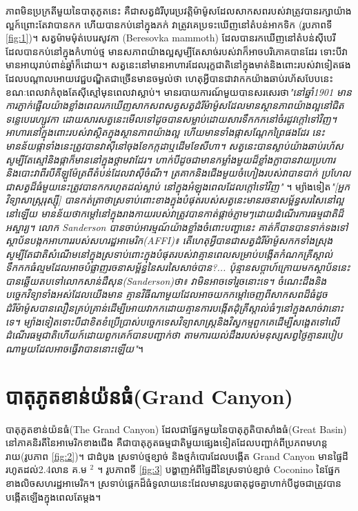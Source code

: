 \documentclass[10pt,twocolumn,letterpaper]{article}
\begin{document}
ភាពមិនប្រក្រតីមួយនៃបាតុភូតនេះ គឺជាសត្វដំរីបុរេប្រវត្តិម៉ាម៉ូសដែលសាកសពរបស់វាត្រូវបានរក្សាយ៉ាងល្អក៍ព្រោះតែវាបានកក ហើយបានកប់នៅក្នុងភក់ វាត្រូវគេប្រទះឃើញនៅតំបន់អាកទិក (រូបភាពទី \ref{fig:1})។ សត្វម៉ាមម៉ុត់បេរេសូវកា (Beresovka mammoth) ដែលបានរកឃើញនៅតំបន់ស៊ីបេរីដែលបានកប់នៅក្នុងកំហាប់ថ្ម មានសភាពយ៉ាងល្អសូម្បីតែសាច់របស់វាក៏អាចបរិភោគបានដែរ ទោះបីវាមានអាយុរាប់ពាន់ឆ្នាំក៏ដោយ។ សត្វនេះនៅមានអាហារដែលរុក្ខជាតិនៅក្នុងមាត់និងពោះរបស់វាទៀតផង ដែលបណ្ដាលអោយវេជ្ជបណ្ឌិតជាច្រើនមានចម្ងល់ថា ហេតុអ្វីបានជាវាកកយ៉ាងឆាប់រហ័សបែបនេះ ខណៈពេលវាកំពុងតែសុីស្មៅមុនពេលវាស្លាប់\cite{17}។ មានរបាយការណ៍មួយបានសរសេរថា\textit{"នៅឆ្នាំ1901 មានការភ្ញាក់ផ្អើលយ៉ាងខ្លាំងពេលរកឃើញសាកសពសត្វសត្វដំរីម៉ាម៉ូសដែលមានស្ថានភាពយ៉ាងល្អនៅជិតទន្លេបេរេហ្សូវកា ដោយសារសត្វនេះមើលទៅដូចបានសម្លាប់ដោយសារទឹកកកនៅចំរដូវក្តៅទៅវិញ។ អាហារនៅក្នុងពោះរបស់វាស្ថិតក្នុងស្ថានភាពយ៉ាងល្អ ហើយមានទាំងផ្កាសណ្តែកព្រៃផងដែរ នេះមានន័យផ្កាទាំងនេះត្រូវបានវាសុីនៅចុងខែកក្កដាឬដើមខែសីហា។ សត្វនេះបានស្លាប់យ៉ាងឆាប់រហ័សសូម្បីតែស្មៅនិងផ្កាក៏មាននៅក្នុងថ្គាមវាដែរ។ ហាក់បីដូចជាមានកម្លាំងមួយដ៏ខ្លាំងក្លាបានវាយប្រហារ និងបោះវាពីរបីគីឡូម៉ែត្រពីតំបន់ដែលវាសុីចំណី។ ត្រគាកនិងជើងមួយចំហៀងរបស់វាបានបាក់ ប្រហែលជាសត្វដ៏ធំមួយនេះត្រូវបានកករហូតដល់ស្លាប់ នៅក្នុងអំឡុងពេលដែលក្តៅទៅវិញ"} \cite{18}។ ម្យ៉ាងទៀត\textit{"[អ្នកវិទ្យាសាស្ត្ររុស្ស៊ី] បានកត់ត្រាថាស្រទាប់ពោះខាងក្នុងបំផុតរបស់សត្វនេះមានរចនាសម្ព័ន្ធសរសៃនៅល្អនៅឡើយ មានន័យថាកម្តៅនៅក្នុងរាងកាយរបស់វាត្រូវបានកាត់ផ្តាច់ភ្លាមៗដោយដំណើរការធម្មជាតិដ៏អស្ចារ្យ។ លោក Sanderson បានចាប់អារម្មណ៍យ៉ាងខ្លាំងចំពោះបញ្ហានេះ គាត់ក៏បានបានទាក់ទងទៅស្ថាប័នបង្កកអាហាររបស់សហរដ្ឋអាមេរិក(AFFI)៖ តើហេតុអ្វីបានជាសត្វដំរីម៉ាម៉ូសកកទាំងស្រុង សូម្បីតែជាតិសំណើមនៅក្នុងស្រទាប់ពោះក្នុងបំផុតរបស់វាគ្មានពេលសម្រាប់បង្កើតកំណកគ្រីស្តាល់ទឹកកកធំល្មមដែលអាចបំផ្លាញរចនាសម្ព័ន្ធនៃសរសៃសាច់បាន?... ប៉ុន្មានសប្តាហ៍ក្រោយមកស្ថាប័ននេះបានឆ្លើយតបទៅលោកសាន់ដឺសុន(Sanderson)ថា៖ វាមិនអាចទៅរួចនោះទេ។ ចំណេះដឹងនិងបច្ចេកវិទ្យាទាំងអស់ដែលយើងមាន គ្មានវិធីណាមួយដែលអាចយកកម្ដៅចេញពីសាកសពដ៏ធំដូចដំរីម៉ាម៉ូសបានលឿនគ្រប់គ្រាន់ដើម្បីអោយវាកកដោយគ្មានការបង្កើតដុំគ្រីស្តាល់ធំៗនៅក្នុងសាច់វានោះទេ។ ម្យ៉ាងទៀតទោះបីជាខិតខំប្រើប្រាស់បច្ចេកទេសវិទ្យាសាស្រ្តនិងវិស្វកម្មពួកគេដើម្បីសង្គេតទៅលើដំណើរធម្មជាតិហើយក៍ដោយ​ពួកគេក៍បានបញ្ជាក់ថា តាមការយល់ដឹងរបស់មនុស្សសព្វថ្ងៃគ្មានរបៀបណាមួយដែលអាចធ្វើវាបាននោះឡើយ"}\cite{19}។

\section{ បាតុភូតខាន់យ៉នធំ(Grand Canyon)}

បាតុភូតខាន់យ៉នធំ(The Grand Canyon) ដែលជាផ្នែកមួយនៃបាតុភូតិបាសាំងធំ(Great Basin) នៅភាគនិរតីនៃអាមេរិកខាងជើង គឺជាបាតុភូតធម្មជាតិមួយផ្សេងទៀតដែលបញ្ជាក់ពីប្រភពមហន្តរាយ(រូបភាព \ref{fig:2})។ ជាដំបូង ស្រទាប់ថ្មខ្សាច់ និងថ្មកំបោរដែលបង្កើត Grand Canyon មានផ្ទៃដីរហូតដល់2.4លាន គ.ម $^2$ \cite{21}។ រូបភាពទី \ref{fig:3} បង្ហាញអំពីផ្ទៃដីនៃស្រទាប់ខ្សាច់ Coconino នៃផ្នែកខាងលិចសហរដ្ឋអាមេរិក។ ស្រទាប់ផ្តេកដ៏ធំទូលាយនេះដែលមានរូបធាតុដូចគ្នាហាក់បីដូចជាត្រូវបានបង្កើតឡើងក្នុងពេលតែម្តង។
\end{document}
